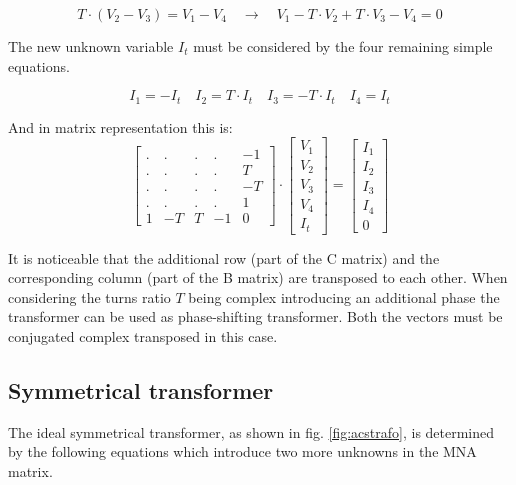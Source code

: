\begin{equation}
T\cdot\left(V_{2} - V_{3}\right) = V_{1} -V_{4}
\quad \rightarrow \quad
V_{1} - T\cdot V_{2} + T\cdot V_{3} - V_{4} = 0
\label{eq:trafo}
\end{equation}

The new unknown variable $I_{t}$ must be considered by the four
remaining simple equations.

\begin{equation}
I_{1} = -I_{t} \quad I_{2} = T\cdot I_{t} \quad I_{3} = -T\cdot I_{t} \quad I_{4} = I_{t}
\end{equation}

And in matrix representation this is:
\begin{equation}
\begin{bmatrix}
.&.&.&.& -1\\
.&.&.&.& T\\
.&.&.&.& -T\\
.&.&.&.& 1\\
1 & -T & T & -1 & 0
\end{bmatrix}
\cdot
\begin{bmatrix}
V_{1}\\
V_{2}\\
V_{3}\\
V_{4}\\
I_{t}
\end{bmatrix}
=
\begin{bmatrix}
I_{1}\\
I_{2}\\
I_{3}\\
I_{4}\\
0
\end{bmatrix}
\end{equation}

It is noticeable that the additional row (part of the C matrix) and the
corresponding column (part of the B matrix) are transposed to each
other.  When considering the turns ratio $T$ being complex introducing
an additional phase the transformer can be used as phase-shifting
transformer.  Both the vectors must be conjugated complex transposed
in this case.

\subsection{Symmetrical transformer}

The ideal symmetrical transformer, as shown in fig.
\ref{fig:acstrafo}, is determined by the following equations which
introduce two more unknowns in the MNA matrix.

